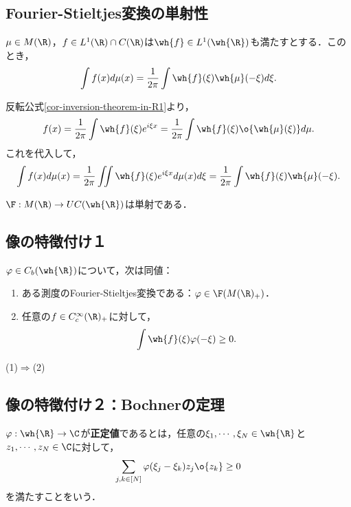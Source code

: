 \documentclass[uplatex,dvipdfmx]{jsreport}
\begin{document}
\subsection{Fourier-Stieltjes変換の単射性}

\begin{theorem}
    $\mu\in M(\R)$，$f\in L^1(\R)\cap C(\R)$は$\wh{f}\in L^1(\wh{\R})$も満たすとする．このとき，
    \[\int f(x)d\mu(x)=\frac{1}{2\pi}\int\wh{f}(\xi)\wh{\mu}(-\xi)d\xi.\]
\end{theorem}
\begin{Proof}
    反転公式\ref{cor-inversion-theorem-in-R1}より，
    \[f(x)=\frac{1}{2\pi}\int\wh{f}(\xi)e^{i\xi x}=\frac{1}{2\pi}\int\wh{f}(\xi)\o{\wh{\mu}(\xi)}d\mu.\]
    これを代入して，
    \[\int f(x)d\mu(x)=\frac{1}{2\pi}\iint\wh{f}(\xi)e^{i\xi x}d\mu(x)d\xi=\frac{1}{2\pi}\int\wh{f}(\xi)\wh{\mu}(-\xi).\]
\end{Proof}

\begin{corollary}
    $\F:M(\R)\to UC(\wh{\R})$は単射である．
\end{corollary}

\subsection{像の特徴付け１}

\begin{theorem}
    $\varphi\in C_b(\wh{\R})$について，次は同値：
    \begin{enumerate}
        \item ある測度のFourier-Stieltjes変換である：$\varphi\in\F(M(\R)_+)$．
        \item 任意の$f\in C^\infty_c(\R)_+$に対して，
        \[\int\wh{f}(\xi)\varphi(-\xi)\ge0.\]
    \end{enumerate}
\end{theorem}
\begin{Proof}\mbox{}
    \begin{description}
        \item[(1)$\Rightarrow$(2)] 
    \end{description}
\end{Proof}

\subsection{像の特徴付け２：Bochnerの定理}

\begin{definition}
    $\varphi:\wh{\R}\to\C$が\textbf{正定値}であるとは，任意の$\xi_1,\cdots,\xi_N\in\wh{\R}$と$z_1,\cdots,z_N\in\C$に対して，
    \[\sum_{j,k\in[N]}\varphi(\xi_j-\xi_k)z_j\o{z_k}\ge0\]
    を満たすことをいう．
\end{definition}
\end{document}
